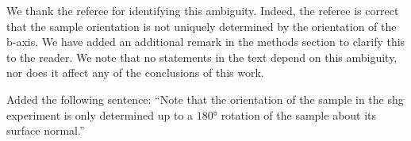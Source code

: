 We thank the referee for identifying this ambiguity.
Indeed, the referee is correct that the sample orientation is not uniquely determined by the orientation of the b-axis.
We have added an additional remark in the methods section to clarify this to the reader.
We note that no statements in the text depend on this ambiguity, nor does it affect any of the conclusions of this work.

\begin{changesmade}
Added the following sentence: ``Note that the orientation of the sample in the \gls{shg} experiment is only determined up to a $\ang{180}$ rotation of the sample about its surface normal.''
\end{changesmade}
